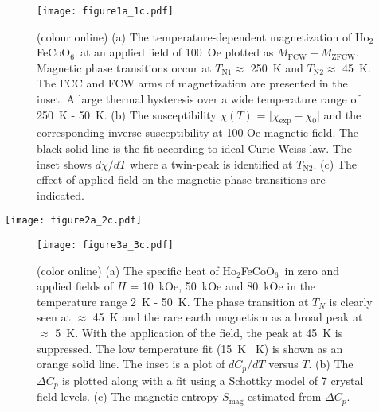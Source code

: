 \documentclass[12pt,twocolumns]{iopart}
\newcommand{\HFCO}{Ho$_2$FeCoO$_6$}
\begin{document}
\begin{figure}[!t]
	\centering
	\texttt{[image: figure1a\_1c.pdf]}
	\caption{(colour online) (a) The temperature-dependent magnetization of \HFCO\ at an 
		applied field of 100~Oe plotted as $M_\mathrm{FCW} - M_\mathrm{ZFCW}$.
		Magnetic phase transitions occur at $T_\mathrm{N1} \approx$ 250~K and $T_\mathrm{N2} \approx$ 45~K.
		The FCC and FCW arms of magnetization are presented in the inset.
		A large thermal hysteresis over a wide temperature range of 250~K - 50~K.
		(b) The susceptibility $\chi(T)$ = [$\chi_\mathrm{exp} - \chi_\mathrm{0}$] and 
		the corresponding inverse susceptibility at 100 Oe magnetic field.
		The black solid line is the fit according to ideal Curie-Weiss law.
		The inset shows $d\chi/dT$ where a twin-peak is identified at $T_\mathrm{N2}$.
		(c) The effect of applied field on the magnetic phase transitions are indicated. \label{fig:mt}}
\end{figure}
\clearpage\newpage
\begin{figure*}[!t]
		\centering
		\texttt{[image: figure2a\_2c.pdf]}
		\caption{(colour online) (a) No frequency dependence of the real part of ac susceptibility, $\chi'(T)$ over 0.3~Hz to 999~Hz is observed at $T_\mathrm{N2}$ for \HFCO.
			(b) With a superposed DC magnetic field, the peak at $T_\mathrm{N2}$ is observed to get suppressed while slightly shifting to the low temperatures.
			The vertical dash-dotted line is drawn to indicate this shift.
			(c) The isothermal magnetization at different temperatures in the range 5~K to 100~K. \label{fig:acchi}}
\end{figure*}
\clearpage\newpage
\begin{figure}[!t]
	\centering
	\texttt{[image: figure3a\_3c.pdf]}
	\caption{(color online) (a) The specific heat of \HFCO\ in zero and applied fields of $H$ = 10~kOe, 50~kOe and 80~kOe in the temperature range 2~K - 50~K. The phase transition at $T_N$ is clearly seen at $\approx$ 45~K and the rare earth magnetism as a broad peak at $\approx$ 5~K. With the application of the field, the peak at 45~K is suppressed. The low temperature fit (15~K ~K) is shown as an orange solid line. The inset is a plot of $dC_p/dT$ versus $T$. (b) The $\Delta C_p$ is plotted along with a fit using a Schottky model of 7 crystal field levels. (c) The magnetic entropy $S_\mathrm{mag}$ estimated from $\Delta C_p$. \label{fig:spheat1}}
\end{figure}
\end{document}
